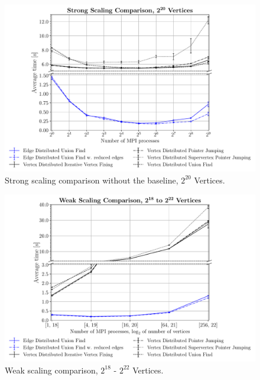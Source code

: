 \documentclass[letterpaper]{article}
\begin{document}
\begin{figure}
  \includegraphics[width=\columnwidth]{../benchmark-results/plots/strongscaling_s20.pdf}
  \caption{Strong scaling comparison without the baseline, $2^{20}$ Vertices.}
  \label{fig:strongscaling-20}
\end{figure}
\begin{figure}
  \includegraphics[width=\columnwidth]{../benchmark-results/plots/weakscaling.pdf}
  \caption{Weak scaling comparison, $2^{18}$ - $2^{22}$ Vertices.}
  \label{fig:weakscaling}
\end{figure}
\end{document}

